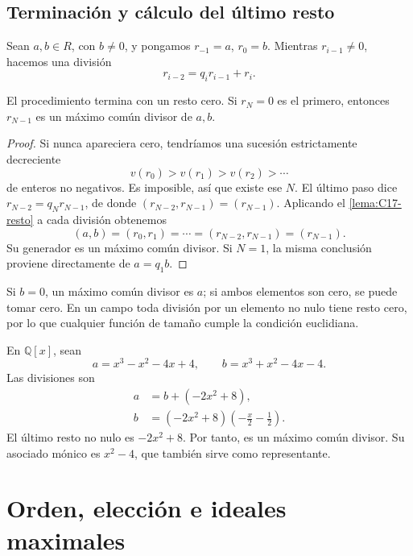 \subsection{Terminación y cálculo del último resto}
Sean $a,b\in R$, con $b\ne0$, y pongamos $r_{-1}=a$, $r_0=b$. Mientras $r_{i-1}\ne0$, hacemos una división
\[
r_{i-2}=q_i r_{i-1}+r_i.
\]
\begin{prop}\label{prop:C17-Euclides}
El procedimiento termina con un resto cero. Si $r_N=0$ es el primero, entonces $r_{N-1}$ es un máximo común divisor de $a,b$.
\end{prop}
\begin{proof}
Si nunca apareciera cero, tendríamos una sucesión estrictamente decreciente
\[
v(r_0)>v(r_1)>v(r_2)>\cdots
\]
de enteros no negativos. Es imposible, así que existe ese $N$. El último paso dice $r_{N-2}=q_Nr_{N-1}$, de donde $(r_{N-2},r_{N-1})=(r_{N-1})$. Aplicando el \cref{lema:C17-resto} a cada división obtenemos
\[
(a,b)=(r_0,r_1)=\cdots=(r_{N-2},r_{N-1})=(r_{N-1}).
\]
Su generador es un máximo común divisor. Si $N=1$, la misma conclusión proviene directamente de $a=q_1b$.
\end{proof}
Si $b=0$, un máximo común divisor es $a$; si ambos elementos son cero, se puede tomar cero. En un campo toda división por un elemento no nulo tiene resto cero, por lo que cualquier función de tamaño cumple la condición euclidiana.

\begin{ejem}
En $\mathbb Q[x]$, sean
\[
a=x^3-x^2-4x+4,\qquad b=x^3+x^2-4x-4.
\]
Las divisiones son
\[
\begin{aligned}
a&=b+(-2x^2+8),\\
b&=(-2x^2+8)\left(-\frac{x}{2}-\frac12\right).
\end{aligned}
\]
El último resto no nulo es $-2x^2+8$. Por tanto, es un máximo común divisor. Su asociado mónico es $x^2-4$, que también sirve como representante.
\end{ejem}

\section{Orden, elección e ideales maximales}
